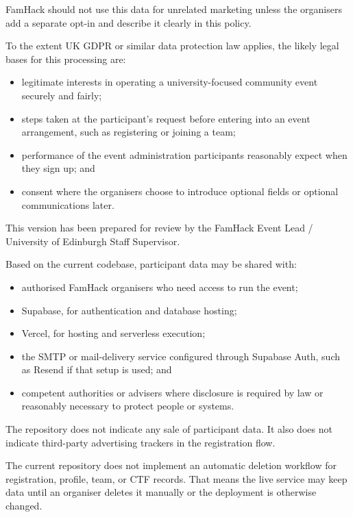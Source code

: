 \documentclass[11pt]{article}
\begin{document}
FamHack should not use this data for unrelated marketing unless the organisers add a separate opt-in and describe it clearly in this policy.

To the extent UK GDPR or similar data protection law applies, the likely legal bases for this processing are:
\begin{itemize}
  \item legitimate interests in operating a university-focused community event securely and fairly;
  \item steps taken at the participant's request before entering into an event arrangement, such as registering or joining a team;
  \item performance of the event administration participants reasonably expect when they sign up; and
  \item consent where the organisers choose to introduce optional fields or optional communications later.
\end{itemize}

This version has been prepared for review by the FamHack Event Lead / University of Edinburgh Staff Supervisor.

Based on the current codebase, participant data may be shared with:
\begin{itemize}
  \item authorised FamHack organisers who need access to run the event;
  \item Supabase, for authentication and database hosting;
  \item Vercel, for hosting and serverless execution;
  \item the SMTP or mail-delivery service configured through Supabase Auth, such as Resend if that setup is used; and
  \item competent authorities or advisers where disclosure is required by law or reasonably necessary to protect people or systems.
\end{itemize}

The repository does not indicate any sale of participant data. It also does not indicate third-party advertising trackers in the registration flow.

The current repository does not implement an automatic deletion workflow for registration, profile, team, or CTF records. That means the live service may keep data until an organiser deletes it manually or the deployment is otherwise changed.
\end{document}
